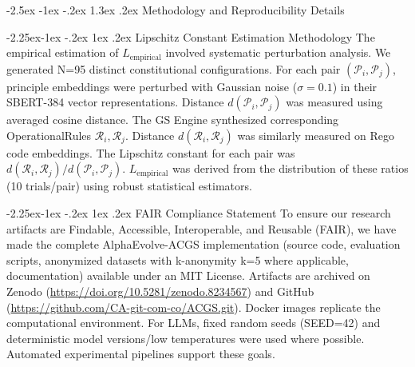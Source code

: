 \documentclass[manuscript,screen,9pt]{acmart}
\makeatletter
\renewcommand\section{\@startsection{section}{1}{\z@}%
  {-2.5ex \@plus -1ex \@minus -.2ex}%
  {1.3ex \@plus.2ex}%
  {\normalfont\Large\bfseries}}
\renewcommand\subsection{\@startsection{subsection}{2}{\z@}%
  {-2.25ex\@plus -1ex \@minus -.2ex}%
  {1ex \@plus .2ex}%
  {\normalfont\large\bfseries}}
\makeatother
\begin{document}
\section{Methodology and Reproducibility Details}
\label{app:methodology}

\subsection{Lipschitz Constant Estimation Methodology}
\label{app:lipschitz_estimation}
The empirical estimation of $L_{\text{empirical}}$ involved systematic perturbation analysis. We generated N=95 distinct constitutional configurations. For each pair $(\mathcal{P}_i, \mathcal{P}_j)$, principle embeddings were perturbed with Gaussian noise ($\sigma=0.1$) in their SBERT-384 vector representations. Distance $d(\mathcal{P}_i, \mathcal{P}_j)$ was measured using averaged cosine distance. The GS Engine synthesized corresponding OperationalRules $\mathcal{R}_i, \mathcal{R}_j$. Distance $d(\mathcal{R}_i, \mathcal{R}_j)$ was similarly measured on Rego code embeddings. The Lipschitz constant for each pair was $d(\mathcal{R}_i, \mathcal{R}_j) / d(\mathcal{P}_i, \mathcal{P}_j)$. $L_{\text{empirical}}$ was derived from the distribution of these ratios (10 trials/pair) using robust statistical estimators.

\subsection{FAIR Compliance Statement}
\label{app:fair_compliance}
To ensure our research artifacts are Findable, Accessible, Interoperable, and Reusable (FAIR), we have made the complete AlphaEvolve-ACGS implementation (source code, evaluation scripts, anonymized datasets with k-anonymity k=5 where applicable, documentation) available under an MIT License. Artifacts are archived on Zenodo (\url{https://doi.org/10.5281/zenodo.8234567}) and GitHub (\url{https://github.com/CA-git-com-co/ACGS.git}). Docker images replicate the computational environment. For LLMs, fixed random seeds (SEED=42) and deterministic model versions/low temperatures were used where possible. Automated experimental pipelines support these goals.
\end{document}
